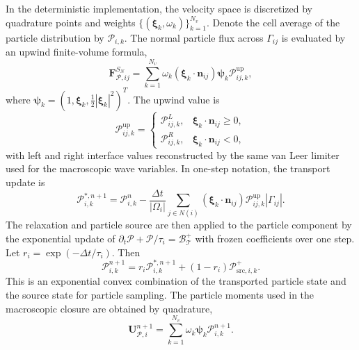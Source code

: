 \documentclass[preprint,12pt]{elsarticle}
\begin{document}
In the deterministic implementation, the velocity space is discretized by quadrature points and weights $\{(\boldsymbol{\xi}_k,\omega_k)\}_{k=1}^{N_v}$. Denote the cell average of the particle distribution by $\mathcal{P}_{i,k}$. The normal particle flux across $\Gamma_{ij}$ is evaluated by an upwind finite-volume formula,
\begin{equation}\label{eq:sn_particle_flux}
    \mathbf F_{\mathcal{P},ij}^{S_N}
    =
    \sum_{k=1}^{N_v}
    \omega_k
    (\boldsymbol{\xi}_k\cdot\boldsymbol{n}_{ij})\boldsymbol{\psi}_k
    \mathcal{P}_{ij,k}^{\mathrm{up}},
\end{equation}
where $\boldsymbol{\psi}_k=\left(1,\boldsymbol{\xi}_k,\frac{1}{2}|\boldsymbol{\xi}_k|^2\right)^T$. The upwind value is
\begin{equation}
    \mathcal{P}_{ij,k}^{\mathrm{up}}
    =
    \begin{cases}
    \mathcal{P}_{ij,k}^{L}, & \boldsymbol{\xi}_k\cdot\boldsymbol{n}_{ij}\ge0,\\
    \mathcal{P}_{ij,k}^{R}, & \boldsymbol{\xi}_k\cdot\boldsymbol{n}_{ij}<0,
    \end{cases}
\end{equation}
with left and right interface values reconstructed by the same van Leer limiter used for the macroscopic wave variables. In one-step notation, the transport update is
\begin{equation}\label{eq:sn_transport_update}
    \mathcal{P}_{i,k}^{*,n+1}
    =
    \mathcal{P}_{i,k}^{n}
    -
    \frac{\Delta t}{|\Omega_i|}
    \sum_{j\in N(i)}
    (\boldsymbol{\xi}_k\cdot\boldsymbol{n}_{ij})
    \mathcal{P}_{ij,k}^{\mathrm{up}} |\Gamma_{ij}|.
\end{equation}
The relaxation and particle source are then applied to the particle component by the exponential update of
$\partial_t\mathcal{P}+\mathcal{P}/\tau_i=\mathcal B_\mathcal{T}^+$ with frozen coefficients over one step. Let
$r_i=\exp(-\Delta t/\tau_i)$. Then
\begin{equation}\label{eq:sn_relax_source_update}
    \mathcal{P}_{i,k}^{n+1}
    =
    r_i\mathcal{P}_{i,k}^{*,n+1}
    +
    (1-r_i)\mathcal{P}_{\mathrm{src},i,k}^{+}.
\end{equation}
This is an exponential convex combination of the transported particle state and the source state for particle sampling.
The particle moments used in the macroscopic closure are obtained by quadrature,
\begin{equation}\label{eq:sn_particle_moments}
    \mathbf U_{\mathcal{P},i}^{n+1}
    =
    \sum_{k=1}^{N_v}\omega_k\boldsymbol{\psi}_k\mathcal{P}_{i,k}^{n+1}.
\end{equation}
\end{document}
